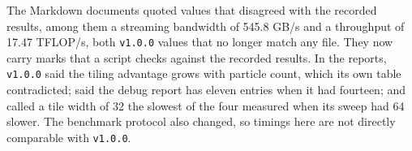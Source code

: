 The Markdown documents quoted values that disagreed with the recorded results, among them
a streaming bandwidth of 545.8 GB/s and a throughput of 17.47 TFLOP/s, both \texttt{v1.0.0}
values that no longer match any file. They now carry marks that a script checks against
the recorded results. In the reports, \texttt{v1.0.0} said the tiling advantage grows with
particle count, which its own table contradicted; said the debug report has eleven entries
when it had fourteen; and called a tile width of 32 the slowest of the four measured when
its sweep had 64 slower. The benchmark protocol also changed, so timings here are not
directly comparable with \texttt{v1.0.0}.
